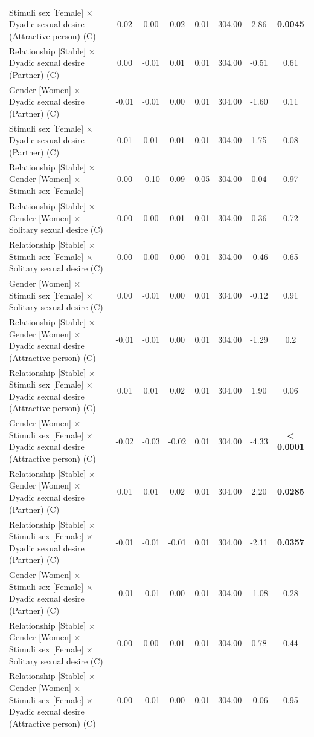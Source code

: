 \documentclass[
  bookmarksnumbered]{article}
\begin{document}
\begin{table}[H]
{\begin{threeparttable}
\begin{tabular}[t]{lccccccc}
Stimuli sex [Female] × Dyadic sexual desire (Attractive person) (C) & 0.02 & 0.00 & 0.02 & 0.01 & 304.00 & 2.86 & \textbf{0.0045}\\
Relationship [Stable] × Dyadic sexual desire (Partner) (C) & 0.00 & -0.01 & 0.01 & 0.01 & 304.00 & -0.51 & 0.61\\
Gender [Women] × Dyadic sexual desire (Partner) (C) & -0.01 & -0.01 & 0.00 & 0.01 & 304.00 & -1.60 & 0.11\\
Stimuli sex [Female] × Dyadic sexual desire (Partner) (C) & 0.01 & 0.01 & 0.01 & 0.01 & 304.00 & 1.75 & 0.08\\
Relationship [Stable] × Gender [Women] × Stimuli sex [Female] & 0.00 & -0.10 & 0.09 & 0.05 & 304.00 & 0.04 & 0.97\\
Relationship [Stable] × Gender [Women] × Solitary sexual desire (C) & 0.00 & 0.00 & 0.01 & 0.01 & 304.00 & 0.36 & 0.72\\
Relationship [Stable] × Stimuli sex [Female] × Solitary sexual desire (C) & 0.00 & 0.00 & 0.00 & 0.01 & 304.00 & -0.46 & 0.65\\
Gender [Women] × Stimuli sex [Female] × Solitary sexual desire (C) & 0.00 & -0.01 & 0.00 & 0.01 & 304.00 & -0.12 & 0.91\\
Relationship [Stable] × Gender [Women] × Dyadic sexual desire (Attractive person) (C) & -0.01 & -0.01 & 0.00 & 0.01 & 304.00 & -1.29 & 0.2\\
Relationship [Stable] × Stimuli sex [Female] × Dyadic sexual desire (Attractive person) (C) & 0.01 & 0.01 & 0.02 & 0.01 & 304.00 & 1.90 & 0.06\\
Gender [Women] × Stimuli sex [Female] × Dyadic sexual desire (Attractive person) (C) & -0.02 & -0.03 & -0.02 & 0.01 & 304.00 & -4.33 & \textbf{< 0.0001}\\
Relationship [Stable] × Gender [Women] × Dyadic sexual desire (Partner) (C) & 0.01 & 0.01 & 0.02 & 0.01 & 304.00 & 2.20 & \textbf{0.0285}\\
Relationship [Stable] × Stimuli sex [Female] × Dyadic sexual desire (Partner) (C) & -0.01 & -0.01 & -0.01 & 0.01 & 304.00 & -2.11 & \textbf{0.0357}\\
Gender [Women] × Stimuli sex [Female] × Dyadic sexual desire (Partner) (C) & -0.01 & -0.01 & 0.00 & 0.01 & 304.00 & -1.08 & 0.28\\
Relationship [Stable] × Gender [Women] × Stimuli sex [Female] × Solitary sexual desire (C) & 0.00 & 0.00 & 0.01 & 0.01 & 304.00 & 0.78 & 0.44\\
Relationship [Stable] × Gender [Women] × Stimuli sex [Female] × Dyadic sexual desire (Attractive person) (C) & 0.00 & -0.01 & 0.00 & 0.01 & 304.00 & -0.06 & 0.95\\

\end{tabular}
\end{threeparttable}}
\end{table}
\end{document}
